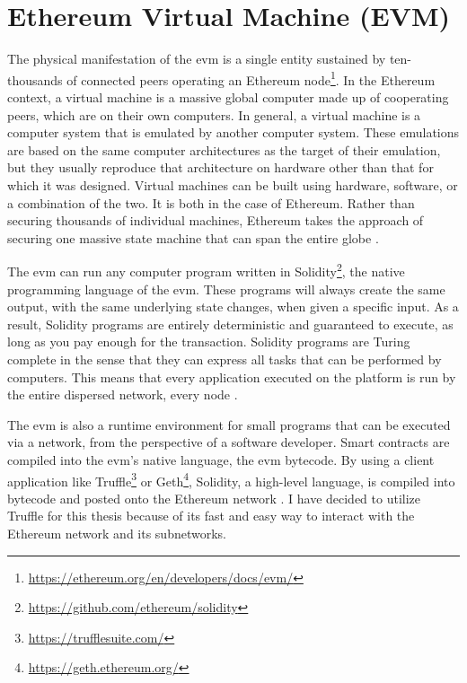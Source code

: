\section{Ethereum Virtual Machine (EVM)}
\label{sec:evm}
The physical manifestation of the \acrshort{evm} is a single entity sustained by ten-thousands of connected peers operating an Ethereum node\footnote{\url{https://ethereum.org/en/developers/docs/evm/}}.
In the Ethereum context, a virtual machine is a massive global computer made up of cooperating peers, which are on their own computers. In general, a virtual machine is a computer system that is emulated by another computer system. These emulations are based on the same computer architectures as the target of their emulation, but they usually reproduce that architecture on hardware other than that for which it was designed. Virtual machines can be built using hardware, software, or a combination of the two. It is both in the case of Ethereum. Rather than securing thousands of individual machines, Ethereum takes the approach of securing one massive state machine that can span the entire globe \cite[48]{dannen2017introducing}.

The \acrshort{evm} can run any computer program written in Solidity\footnote{\url{https://github.com/ethereum/solidity}}, the native programming language of the \acrshort{evm}. These programs will always create the same output, with the same underlying state changes, when given a specific input. As a result, Solidity programs are entirely deterministic and guaranteed to execute, as long as you pay enough for the transaction. Solidity programs are Turing complete in the sense that they can express all tasks that can be performed by computers. This means that every application executed on the platform is run by the entire dispersed network, every node \cite[50]{dannen2017introducing}.

The \acrshort{evm} is also a runtime environment for small programs that can be executed via a network, from the perspective of a software developer. Smart contracts are compiled into the \acrshort{evm}'s native language, the \acrshort{evm} bytecode. By using a client application like Truffle\footnote{\url{https://trufflesuite.com/}} or Geth\footnote{\url{https://geth.ethereum.org/}}, Solidity, a high-level language, is compiled into bytecode and posted onto the Ethereum network \cite[51]{dannen2017introducing}. I have decided to utilize Truffle for this thesis because of its fast and easy way to interact with the Ethereum network and its subnetworks.
